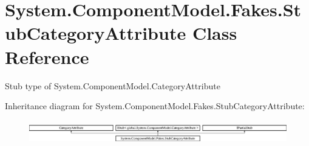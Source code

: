 \hypertarget{class_system_1_1_component_model_1_1_fakes_1_1_stub_category_attribute}{\section{System.\-Component\-Model.\-Fakes.\-Stub\-Category\-Attribute Class Reference}
\label{class_system_1_1_component_model_1_1_fakes_1_1_stub_category_attribute}
}


Stub type of System.\-Component\-Model.\-Category\-Attribute 


Inheritance diagram for System.\-Component\-Model.\-Fakes.\-Stub\-Category\-Attribute\-:\begin{figure}[H]
\begin{center}
\leavevmode
\includegraphics[height=1.051643cm]{class_system_1_1_component_model_1_1_fakes_1_1_stub_category_attribute}
\end{center}
\end{figure}
